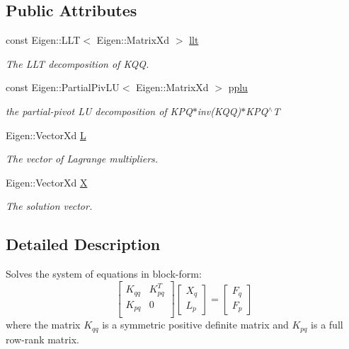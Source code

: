 \subsection*{Public Attributes}
\begin{DoxyCompactItemize}
\item 
const Eigen\+::\+L\+L\+T$<$ Eigen\+::\+Matrix\+Xd $>$ \hyperlink{classmodel_1_1_schur_complement_solver_a34b95f56894b2e52a9bc2e690ce7da28}{llt}
\begin{DoxyCompactList}\small\item\em The L\+L\+T decomposition of K\+Q\+Q. \end{DoxyCompactList}\item 
const Eigen\+::\+Partial\+Piv\+L\+U$<$ Eigen\+::\+Matrix\+Xd $>$ \hyperlink{classmodel_1_1_schur_complement_solver_a49a021c28be0230019e32c2d58b172d3}{pplu}
\begin{DoxyCompactList}\small\item\em the partial-\/pivot L\+U decomposition of K\+P\+Q$\ast$inv(K\+Q\+Q)$\ast$\+K\+P\+Q$^\wedge$\+T \end{DoxyCompactList}\item 
Eigen\+::\+Vector\+Xd \hyperlink{classmodel_1_1_schur_complement_solver_af911959dab6c88ef36abb723c15ec4f4}{L}
\begin{DoxyCompactList}\small\item\em The vector of Lagrange multipliers. \end{DoxyCompactList}\item 
Eigen\+::\+Vector\+Xd \hyperlink{classmodel_1_1_schur_complement_solver_a9f003385888ebea2f2d52df7bb7dffe7}{X}
\begin{DoxyCompactList}\small\item\em The solution vector. \end{DoxyCompactList}\end{DoxyCompactItemize}


\subsection{Detailed Description}
Solves the system of equations in block-\/form\+: \[ \left[ \begin{array}{ll} K_{qq} & K_{pq}^T\\ K_{pq} & 0\\ \end{array} \right] \left[ \begin{array}{l} X_q\\ L_p \end{array} \right] = \left[ \begin{array}{l} F_q\\ F_p \end{array} \right] \] where the matrix $K_{qq}$ is a symmetric positive definite matrix and $K_{pq}$ is a full row-\/rank matrix. 

